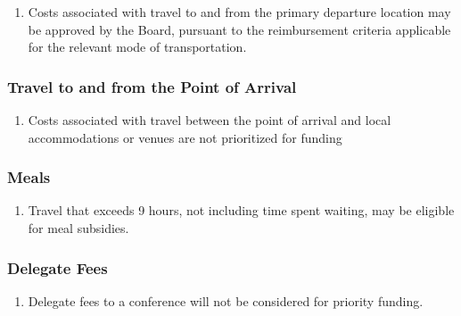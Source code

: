 \begin{enumerate}
 \item
  Costs associated with travel to and from the primary departure location may be approved by the Board, pursuant to the reimbursement criteria applicable for the relevant mode of transportation.
\end{enumerate}

\subsubsection{Travel to and from the Point of Arrival}
\label{travel-to-and-from-the-point-of-arrival}

\begin{enumerate}
 \item
  Costs associated with travel between the point of arrival and local accommodations or venues are not prioritized for funding
\end{enumerate}

\subsubsection{Meals}
\label{meals}

\begin{enumerate}
 \item
  Travel that exceeds 9 hours, not including time spent waiting, may be eligible for meal subsidies.
\end{enumerate}

\subsubsection{Delegate Fees}
\label{delegate-fees}

\begin{enumerate}
 \item
  Delegate fees to a conference will not be considered for priority funding.
\end{enumerate}

